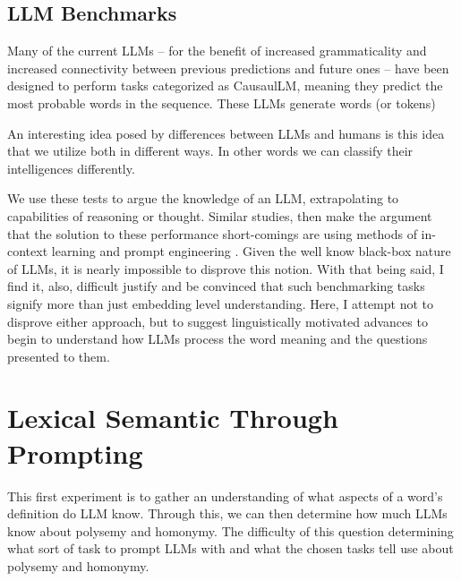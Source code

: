 \documentclass{brandeis-thesis3.2}
\theoremstyle{plain}
\theoremstyle{definition}
\theoremstyle{remark}
\numberwithin{equation}{section}
\renewcommand\cite{\citep}
\begin{document}
\section{LLM Benchmarks}
Many of the current LLMs -- for the benefit of increased grammaticality and increased connectivity between previous predictions and future ones --  have been designed to perform tasks categorized as CausaulLM, meaning they predict the most probable words in the sequence. These LLMs generate words (or tokens)

An interesting idea posed by differences between LLMs and humans is this idea that we utilize both in different ways. In other words we can classify their intelligences differently.

We use these tests to argue the knowledge of an LLM, extrapolating to capabilities of reasoning or thought. Similar studies, then make the argument that the solution to these performance short-comings are using methods of in-context learning and prompt engineering \cite{brown_language_2020, wei_chain--thought_2023}. Given the well know black-box nature of LLMs, it is nearly impossible to disprove this notion. With that being said, I find it, also, difficult justify and be convinced that such benchmarking tasks signify more than just embedding level understanding. Here, I attempt not to disprove either approach, but to suggest linguistically motivated advances to begin to understand how LLMs process the word meaning and the questions presented to them.

\chapter{Lexical Semantic Through Prompting}
This first experiment is to gather an understanding of what aspects of a word's definition do LLM know. Through this, we can then determine how much LLMs know about polysemy and homonymy. The difficulty of this question determining what sort of task to prompt LLMs with and what the chosen tasks tell use about polysemy and homonymy. 
\end{document}
